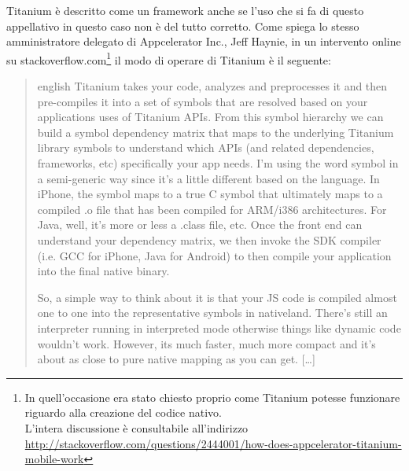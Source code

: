             Titanium è descritto come un frame\-work \crosscomp{}\citep{Web:peptechlearn.blogspot.it} anche se l'uso che si fa di
            questo appellativo in questo caso non è del tutto corretto. Come
            spiega lo stesso amministratore delegato di Appcelerator Inc., Jeff
            Haynie, in un intervento online su
            \mbox{stackoverflow.com}\footnote{In quell'occasione era stato
            chiesto proprio come Titanium potesse funzionare riguardo alla
            creazione del codice nativo.\\L'intera discussione è consultabile
            all'indirizzo
            \url{http://stackoverflow.com/questions/2444001/how-does-appcelerator-titanium-mobile-work}}
            il modo di operare di Titanium è il seguente:
            \begin{quotation}
                \begin{hyphenrules}{english}
                Titanium takes your \js{} code, analyzes and preprocesses
                it and then pre-compiles it into a set of symbols that are
                resolved based on your applications uses of Titanium APIs. From
                this symbol hierarchy we can build a symbol dependency matrix
                that maps to the underlying Titanium library symbols to
                understand which APIs (and related dependencies, frameworks,
                etc) specifically your app needs. I'm using the word symbol in a
                semi-generic way since it's a little different based on the
                language. In iPhone, the symbol maps to a true C symbol that
                ultimately maps to a compiled .o file that has been compiled for
                ARM/i386 architectures. For Java, well, it's more or less a
                .class file, etc. Once the front end can understand your
                dependency matrix, we then invoke the SDK compiler (i.e. GCC for
                iPhone, Java for Android) to then compile your application into
                the final native binary.

                So, a simple way to think about it is that your JS code is
                compiled almost one to one into the representative symbols in
                nativeland. There's still an interpreter running in interpreted
                mode otherwise things like dynamic code wouldn't work. However,
                its much faster, much more compact and it's about as close to
                pure native mapping as you can get. [\ldots]
                \end{hyphenrules}
            \end{quotation}
